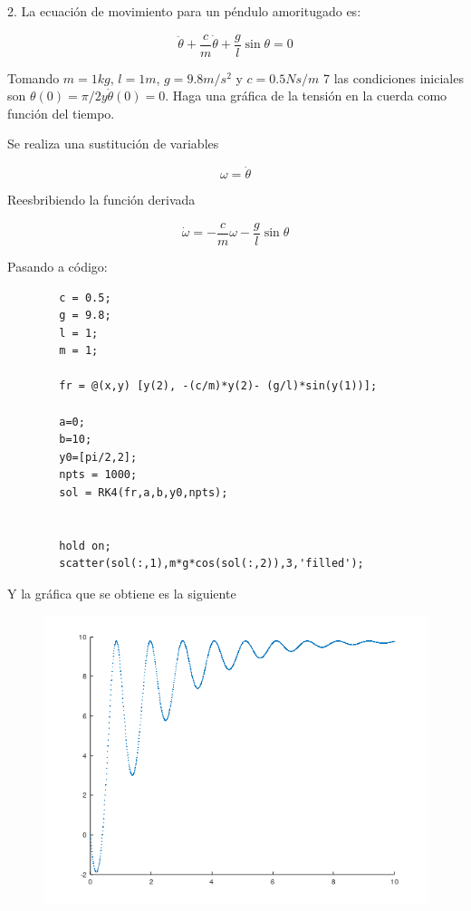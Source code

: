 \documentclass[a4paper, 12pt]{article}
\begin{document}
    2. La ecuación de movimiento para un péndulo amoritugado es:

    \[
        \ddot{\theta} + \frac{c}{m} \dot{\theta} + \frac{g}{l} \sin \theta = 0  
    \]

    Tomando $m=1 kg$, $l=1m$, $g=9.8m/s^2$ y $c=0.5 Ns/m$ 7 las condiciones iniciales son $\theta(0) = \pi/2 y \dot{\theta}(0) = 0$. Haga una gráfica de la tensión en la cuerda como función del tiempo.

    Se realiza una sustitución de variables

    \[
        \omega = \dot{\theta}
    \]

    Reesbribiendo la función derivada

    \[
        \dot{\omega} = -\frac{c}{m}\omega - \frac{g}{l} \sin \theta
    \]

    Pasando a código:

    \begin{verbatim}
        c = 0.5;
        g = 9.8;
        l = 1;
        m = 1;

        fr = @(x,y) [y(2), -(c/m)*y(2)- (g/l)*sin(y(1))];

        a=0;
        b=10;
        y0=[pi/2,2];
        npts = 1000;
        sol = RK4(fr,a,b,y0,npts);


        hold on;
        scatter(sol(:,1),m*g*cos(sol(:,2)),3,'filled');
    \end{verbatim}

    Y la gráfica que se obtiene es la siguiente

    \begin{figure}[ht!]
        \centering
        \includegraphics[width=16cm]{img/e2.png}
    \end{figure}
\end{document}
